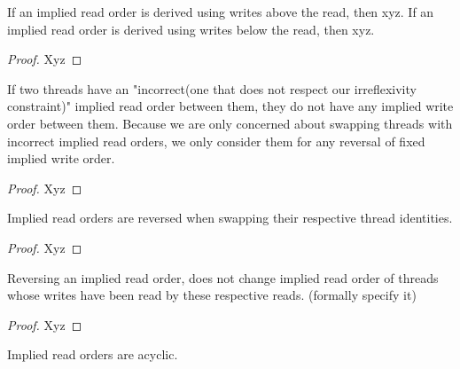     \begin{property}
        \label{inf-iwo}
        If an implied read order is derived using writes above the read, then xyz.
        If an implied read order is derived using writes below the read, then xyz.
    \end{property}

    \begin{proof}
        Xyz
    \end{proof}

    \begin{property}
        \label{iro-no-iwo}
        If two threads have an "incorrect(one that does not respect our irreflexivity constraint)" implied read order between them, they do not have any implied write order between them. 
        Because we are only concerned about swapping threads with incorrect implied read orders, we only consider them for any reversal of fixed implied write order.     
    \end{property}

    \begin{proof}
        Xyz
    \end{proof}

    \begin{property}
        \label{iro-Rev}
        Implied read orders are reversed when swapping their respective thread identities.
    \end{property}

    \begin{proof}
        Xyz
    \end{proof}

    \begin{property}
        \label{iro-partial-stability}
        Reversing an implied read order, does not change implied read order of threads whose writes have been read by these respective reads. (formally specify it)
    \end{property}

    \begin{proof}
        Xyz
    \end{proof}

    \begin{property}
        \label{acyclic-iro}
        Implied read orders are acyclic.
    \end{property}

